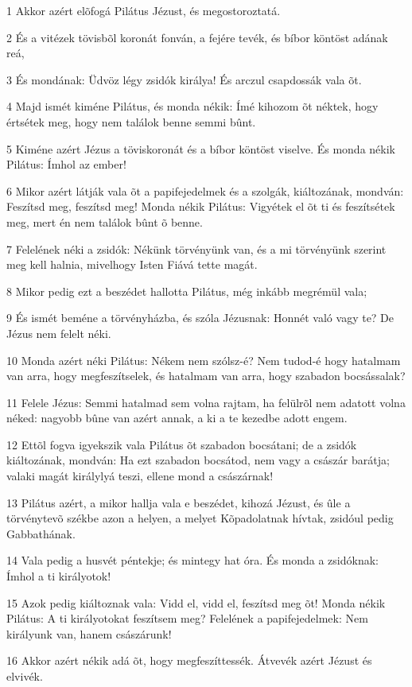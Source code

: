 \par 1 Akkor azért elõfogá Pilátus Jézust, és megostoroztatá.
\par 2 És a vitézek tövisbõl koronát fonván, a fejére tevék, és bíbor köntöst adának reá,
\par 3 És mondának: Üdvöz légy zsidók királya! És arczul csapdossák vala õt.
\par 4 Majd ismét kiméne Pilátus, és monda nékik: Ímé kihozom õt néktek, hogy értsétek meg, hogy nem találok benne semmi bûnt.
\par 5 Kiméne azért Jézus a töviskoronát és a bíbor köntöst viselve. És monda nékik Pilátus: Ímhol az ember!
\par 6 Mikor azért látják vala õt a papifejedelmek és a szolgák, kiáltozának, mondván: Feszítsd meg, feszítsd meg! Monda nékik Pilátus: Vigyétek el õt ti és feszítsétek meg, mert én nem találok bûnt õ benne.
\par 7 Felelének néki a zsidók: Nékünk törvényünk van, és a mi törvényünk szerint meg kell halnia, mivelhogy Isten Fiává tette magát.
\par 8 Mikor pedig ezt a beszédet hallotta Pilátus, még inkább megrémül vala;
\par 9 És ismét beméne a törvényházba, és szóla Jézusnak: Honnét való vagy te? De Jézus nem felelt néki.
\par 10 Monda azért néki Pilátus: Nékem nem szólsz-é? Nem tudod-é hogy hatalmam van arra, hogy megfeszítselek, és hatalmam van arra, hogy szabadon bocsássalak?
\par 11 Felele Jézus: Semmi hatalmad sem volna rajtam, ha felülrõl nem adatott volna néked: nagyobb bûne van azért annak, a ki a te kezedbe adott engem.
\par 12 Ettõl fogva igyekszik vala Pilátus õt szabadon bocsátani; de a zsidók kiáltozának, mondván: Ha ezt szabadon bocsátod, nem vagy a császár barátja; valaki magát királylyá teszi, ellene mond a császárnak!
\par 13 Pilátus azért, a mikor hallja vala e beszédet, kihozá Jézust, és ûle a törvénytevõ székbe azon a helyen, a melyet Kõpadolatnak hívtak, zsidóul pedig Gabbathának.
\par 14 Vala pedig a husvét péntekje; és mintegy hat óra. És monda a zsidóknak: Ímhol a ti királyotok!
\par 15 Azok pedig kiáltoznak vala: Vidd el, vidd el, feszítsd meg õt! Monda nékik Pilátus: A ti királyotokat feszítsem meg? Felelének a papifejedelmek: Nem királyunk van, hanem császárunk!
\par 16 Akkor azért nékik adá õt, hogy megfeszíttessék. Átvevék azért Jézust és elvivék.
